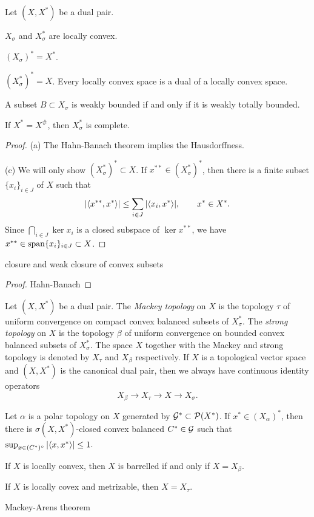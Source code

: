 \documentclass{../../large}
\begin{document}
\begin{prb}
Let $(X,X^*)$ be a dual pair.

\begin{parts}
\item $X_\sigma$ and $X^*_\sigma$ are locally convex.
\item $(X_\sigma)^*=X^*$.
\item $(X^*_\sigma)^*=X$. Every locally convex space is a dual of a locally convex space.
\item A subset $B\subset X_\sigma$ is weakly bounded if and only if it is weakly totally bounded.
\item If $X^*=X^\#$, then $X_\sigma^*$ is complete.
\end{parts}
\end{prb}
\begin{proof}
(a)
The Hahn-Banach theorem implies the Hausdorffness.

(c)
We will only show $(X^*_\sigma)^*\subset X$.
If $x^{**}\in(X^*_\sigma)^*$, then there is a finite subset $\{x_i\}_{i\in J}$ of $X$ such that
\[|\langle x^{**},x^*\rangle|\le\sum_{i\in J}|\langle x_i,x^*\rangle|,\qquad x^*\in X^*.\]
Since $\bigcap_{i\in J}\ker x_i$ is a closed subspace of $\ker x^{**}$, we have $x^{**}\in\operatorname{span}\{x_i\}_{i\in J}\subset X$.
\end{proof}

\begin{prb}
closure and weak closure of convex subsets
\end{prb}
\begin{proof}
Hahn-Banach
\end{proof}

\begin{prb}
Let $(X,X^*)$ be a dual pair.
The \emph{Mackey topology} on $X$ is the topology $\tau$ of uniform convergence on compact convex balanced subsets of $X^*_\sigma$.
The \emph{strong topology} on $X$ is the topology $\beta$ of uniform convergence on bounded convex balanced subsets of $X^*_\sigma$.
The space $X$ together with the Mackey and strong topology is denoted by $X_\tau$ and $X_\beta$ respectively.
If $X$ is a topological vector space and $(X,X^*)$ is the canonical dual pair, then we always have continuous identity operators
\[X_\beta\to X_\tau\to X\to X_\sigma.\]

Let $\alpha$ is a polar topology on $X$ generated by $\mathcal{G}^*\subset\mathcal{P}(X^*)$.
If $x^*\in(X_\alpha)^*$, then there is $\sigma(X,X^*)$-closed convex balanced $C^*\in\mathcal{G}$ such that $\sup_{x\in(C^*)^\circ}|\langle x,x^*\rangle|\le1$.


\begin{parts}
\item If $X$ is locally convex, then $X$ is barrelled if and only if $X=X_\beta$.
\item If $X$ is locally covex and metrizable, then $X=X_\tau$.
\item Mackey-Arens theorem
\end{parts}
\end{prb}
\end{document}
